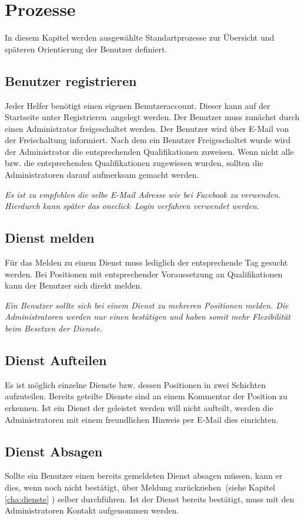 \chapter{Prozesse}
\label{cha:prozesse}
In diesem Kapitel werden ausgewählte Standartprozesse zur Übersicht und späteren Orientierung der Benutzer definiert.

\section{Benutzer registrieren}
\label{sec:process_register}
Jeder Helfer benötigt einen eigenen Benutzeraccount. Dieser kann auf der Startseite unter \glqq Registrieren\grqq ~angelegt werden. Der Benutzer muss zunächst durch einen Administrator freigeschaltet werden. Der Benutzer wird über E-Mail von der Freischaltung informiert. Nach dem ein Benutzer Freigeschaltet wurde wird der Administrator die entsprechenden Qualifikationen zuweisen. Wenn nicht alle bzw. die entsprechenden Qualifikationen zugewiesen wurden, sollten die Administratoren darauf aufmerksam gemacht werden.

\noindent \textit{Es ist zu empfehlen die selbe E-Mail Adresse wie bei Facebook zu verwenden. Hierdurch kann später das \glqq oneclick\grqq ~Login verfahren verwendet werden.}

\section{Dienst melden}
\label{sec:process_position_apply}
Für das Melden zu einem Dienst muss lediglich der entsprechende Tag gesucht werden. Bei Positionen mit entsprechender Voraussetzung an Qualifikationen kann der Benutzer sich direkt melden.

\noindent \textit{Ein Benutzer sollte sich bei einem Dienst zu mehreren Positionen melden. Die Administratoren werden nur einen bestätigen und haben somit mehr Flexibilität beim Besetzen der Dienste.}

\section{Dienst Aufteilen}
\label{sec:process_service_split}
Es ist möglich einzelne Dienste bzw. dessen Positionen in zwei Schichten aufzuteilen. Bereits geteilte Dienste sind an einem Kommentar der Position zu erkennen. Ist ein Dienst der geleistet werden will nicht aufteilt, werden die Administratoren mit einem freundlichen Hinweis per E-Mail dies einrichten.

\section{Dienst Absagen}
\label{sec:process_service_cancel}
Sollte ein Benutzer einen bereits gemeldeten Dienst absagen müssen, kann er dies, wenn noch nicht bestätigt, über \glqq Meldung zurückziehen\grqq ~(siehe Kapitel \ref{cha:dienste} ) selber durchführen. Ist der Dienst bereits bestätigt, muss mit den Administratoren Kontakt aufgenommen werden.